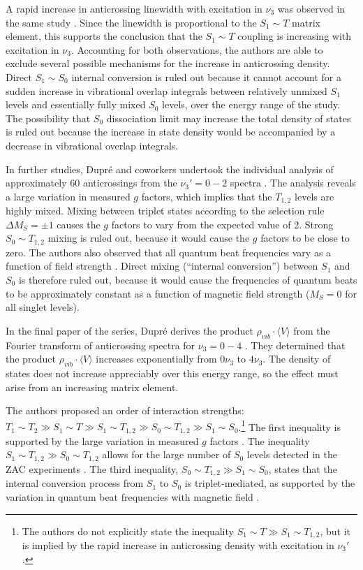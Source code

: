 \documentclass[12pt]{mitthesis}
\begin{document}
A rapid increase in anticrossing linewidth with excitation in $\nu_3$
was observed in the same study \cite{dupre91}.  Since the linewidth is
proportional to the $S_1 \sim T$ matrix element, this supports the
conclusion that the $S_1 \sim T$ coupling is increasing with
excitation in $\nu_3$.  Accounting for both observations, the authors
are able to exclude several possible mechanisms for the increase in
anticrossing density.  Direct $S_1 \sim S_0$ internal conversion is
ruled out because it cannot account for a sudden increase in
vibrational overlap integrals between relatively unmixed $S_1$ levels
and essentially fully mixed $S_0$ levels, over the energy range of the
study.  The possibility that $S_0$ dissociation limit may increase the
total density of states is ruled out because the increase in state
density would be accompanied by a decrease in vibrational overlap
integrals.

In further studies, Dupr\'{e} and coworkers undertook the individual
analysis of approximately 60 anticrossings from the $\nu_3'=0-2$
spectra \cite{dupre95a}.  The analysis reveals a large variation in
measured $g$ factors, which implies that the $T_{1,2}$ levels are
highly mixed.  Mixing between triplet states according to the
selection rule $\Delta M_S = \pm 1$ causes the $g$ factors to vary
from the expected value of $2$.  Strong $S_0 \sim T_{1,2}$ mixing is
ruled out, because it would cause the $g$ factors to be close to zero.
The authors also observed that all quantum beat frequencies vary as a
function of field strength \cite{dupre95a}.  Direct mixing (``internal
conversion'') between $S_1$ and $S_0$ is therefore ruled out, because
it would cause the frequencies of quantum beats to be approximately
constant as a function of magnetic field strength ($M_S=0$ for all
singlet levels).

In the final paper of the series, Dupr\'{e} derives the product
$\rho_{vib} \cdot \langle V \rangle$ from the Fourier transform of
anticrossing spectra for $\nu_3=0-4$ \cite{dupre95b}.  They determined
that the product $\rho_{vib} \cdot \langle V \rangle$ increases
exponentially from $0\nu_3$ to $4\nu_3$.  The density of states does
not increase appreciably over this energy range, so the effect must
arise from an increasing matrix element.

The authors proposed an order of interaction strengths: $T_1 \sim T_2
\gg S_1 \sim T \gg S_1 \sim T_{1,2} \gg S_0 \sim T_{1,2} \gg S_1 \sim
S_0$.\footnote{The authors do not explicitly state the inequality $S_1
  \sim T \gg S_1 \sim T_{1,2}$, but it is implied by the rapid
  increase in anticrossing density with excitation in $\nu_3'$.}  The
first inequality is supported by the large variation in measured $g$
factors \cite{dupre95a}.  The inequality $S_1 \sim T_{1,2} \gg S_0
\sim T_{1,2}$ allows for the large number of $S_0$ levels detected in
the ZAC experiments \cite{dupre91}.  The third inequality, $S_0 \sim
T_{1,2} \gg S_1 \sim S_0$, states that the internal conversion process
from $S_1$ to $S_0$ is triplet-mediated, as supported by the variation
in quantum beat frequencies with magnetic field \cite{dupre95a}.
\end{document}
